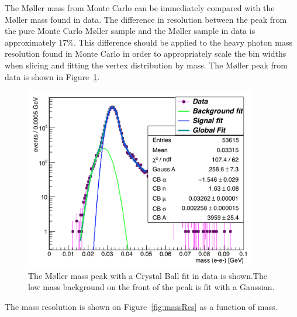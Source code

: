 The M\o ller mass from Monte Carlo can be immediately compared with the M\o ller mass found in data. The difference in resolution between the peak from the pure Monte Carlo M\o ller sample and the M\o ller sample in data is approximately 17$\%$. This difference should be applied to the heavy photon mass resolution found in Monte Carlo in order to appropriately scale the bin widths when slicing and fitting the vertex distribution by mass. The M\o ller peak from data is shown in Figure~\ref{fig:mollerMass}. 

\begin{figure}[H]
  \centering
      \includegraphics[width=0.9\textwidth]{pics/searching/mollerMass.png}
  \caption[Fit to the M\o ller mass peak in data]{The M\o ller mass peak with a Crystal Ball fit in data is shown.The low mass background on the front of the peak is fit with a Gaussian.}
  \label{fig:mollerMass}
\end{figure} 

The mass resolution is shown on Figure~\ref{fig:massRes} as a function of mass.

